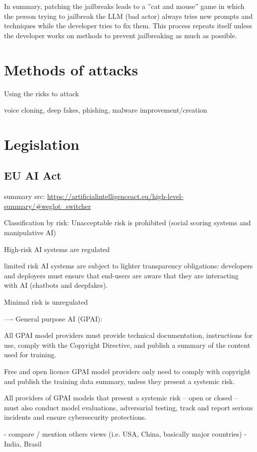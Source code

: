 In summary, patching the jailbreaks leads to a ''cat and mouse'' game in which the person trying to jailbreak the LLM (bad actor) always tries new prompts and techniques while the developer tries to fix them. This process repeats itself unless the developer works on methods to prevent jailbreaking as much as possible.


\section{Methods of attacks}
Using the risks to attack

voice cloning, deep fakes, phishing, malware improvement/creation 

\section{Legislation}

\subsection{EU AI Act}
summary src: \url{https://artificialintelligenceact.eu/high-level-summary/#weglot_switcher}



Classification by risk:
Unacceptable risk is prohibited (social scoring systems and manipulative AI)

High-risk AI systems are regulated

limited risk AI systems are subject to lighter transparency obligations: developers and deployers must ensure that end-users are aware that they are interacting with AI (chatbots and deepfakes).

Minimal risk is unregulated

----
General purpose AI (GPAI):

All GPAI model providers must provide technical documentation, instructions for use, comply with the Copyright Directive, and publish a summary of the content used for training.

Free and open licence GPAI model providers only need to comply with copyright and publish the training data summary, unless they present a systemic risk.

All providers of GPAI models that present a systemic risk – open or closed – must also conduct model evaluations, adversarial testing, track and report serious incidents and ensure cybersecurity protections.

- compare / mention others views (i.e. USA, China, basically major countries)
- India, Brasil






